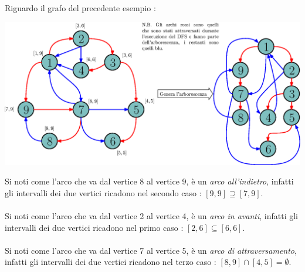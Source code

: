 \documentclass[12pt, letterpaper]{article}
\newcommand{\acc}{\\\hphantom{}\\}
\begin{document}
Riguardo il grafo del precedente esempio : \begin{center}
    \includegraphics[width=1.05\textwidth ]{images/archiArborescenza.eps}
    \end{center}
Si noti come l'arco che va dal vertice 8 al vertice 9, è un \textit{arco all'indietro}, infatti gli intervalli dei due 
vertici ricadono nel secondo caso : \([9,9]\supseteq[7,9]\).\acc  
Si noti come l'arco che va dal vertice 2 al vertice 4, è un \textit{arco in avanti}, infatti gli intervalli dei due 
vertici ricadono nel primo caso : \([2,6]\subseteq[6,6]\).\acc  
Si noti come l'arco che va dal vertice 7 al vertice 5, è un \textit{arco di attraversamento}, infatti gli intervalli dei due 
vertici ricadono nel terzo caso : \([8,9]\cap[4,5]=\emptyset\).\acc  
\end{document}
